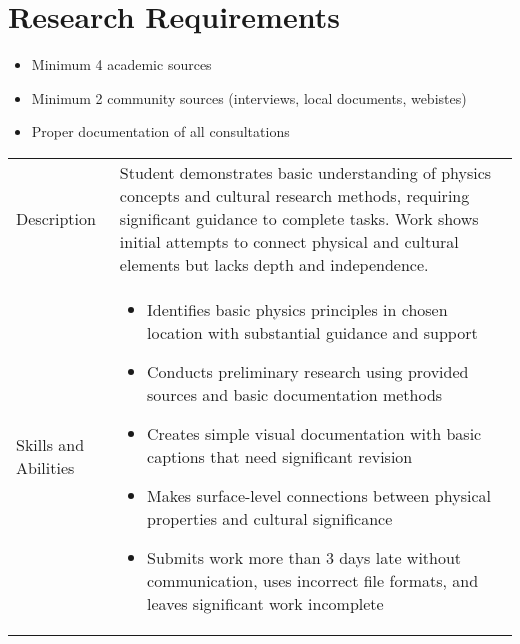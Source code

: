 \documentclass[12pt]{article}
\begin{document}
\section*{Research Requirements}
\begin{itemize}
    \item Minimum 4 academic sources
    \item Minimum 2 community sources (interviews, local documents, webistes)
    \item Proper documentation of all consultations
\end{itemize}



\newpage

\begin{table}[t]
\renewcommand{\arraystretch}{1.5}
\begin{tabular}{>{\raggedright\arraybackslash}p{2cm}|>{\raggedright\arraybackslash}p{14cm}}
\toprule
\multicolumn{2}{l}{\textbf{Emerging}} \\
\midrule
Description & Student demonstrates basic understanding of physics concepts and cultural research methods, requiring significant guidance to complete tasks. Work shows initial attempts to connect physical and cultural elements but lacks depth and independence. \\
\midrule
Skills and Abilities & 
\begin{itemize}
    \item Identifies basic physics principles in chosen location with substantial guidance and support
    \item Conducts preliminary research using provided sources and basic documentation methods
    \item Creates simple visual documentation with basic captions that need significant revision
    \item Makes surface-level connections between physical properties and cultural significance
    \item Submits work more than 3 days late without communication, uses incorrect file formats, and leaves significant work incomplete
\end{itemize} \\
\bottomrule
\end{tabular}
\end{table}
\end{document}
